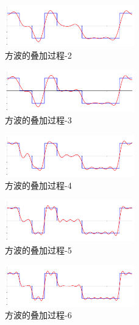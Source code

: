 \documentclass[lang=cn,newtx,10pt,scheme=chinese]{elegantbook}
\begin{document}
\begin{figure}[!htb]
\centering
\includegraphics[width=0.5\textwidth]{fourier_series_arbitrary_function-1.png}
\caption{方波的叠加过程-2}
\label{fig:fourier_series_arbitrary_function-1}
\end{figure}

\begin{figure}[!htb]
\centering
\includegraphics[width=0.5\textwidth]{fourier_series_arbitrary_function-2.png}
\caption{方波的叠加过程-3}
\label{fig:fourier_series_arbitrary_function-2}
\end{figure}

\begin{figure}[!htb]
\centering
\includegraphics[width=0.5\textwidth]{fourier_series_arbitrary_function-3.png}
\caption{方波的叠加过程-4}
\label{fig:fourier_series_arbitrary_function-3}
\end{figure}

\begin{figure}[!htb]
\centering
\includegraphics[width=0.5\textwidth]{fourier_series_arbitrary_function-4.png}
\caption{方波的叠加过程-5}
\label{fig:fourier_series_arbitrary_function-4}
\end{figure}

\begin{figure}[!htb]
\centering
\includegraphics[width=0.5\textwidth]{fourier_series_arbitrary_function-5.png}
\caption{方波的叠加过程-6}
\label{fig:fourier_series_arbitrary_function-5}
\end{figure}
\end{document}
